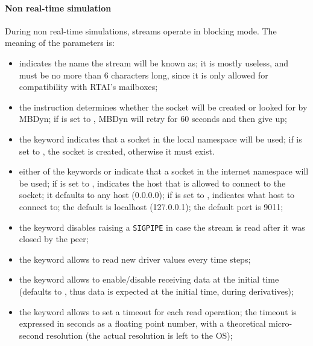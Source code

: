 \paragraph{Non real-time simulation}
During non real-time simulations, streams operate in blocking mode.
The meaning of the parameters is:
\begin{itemize}
\item {} indicates the name the stream will be known as;
it is mostly useless, and must be no more than 6 characters long,
since it is only allowed for compatibility with RTAI's mailboxes;

\item the instruction  determines whether the socket will be
created or looked for by MBDyn; if  is set to ,
MBDyn will retry for 60 seconds and then give up;

\item the keyword  indicates that a socket 
in the local namespace will be used; if  is set to ,
the socket is created, otherwise it must exist.

\item either of the keywords  or  indicate that a socket
in the internet namespace will be used;
if  is set to ,  indicates 
the host that is allowed to connect to the socket; it defaults 
to any host (0.0.0.0); if  is set to ,
 indicates what host to connect to; the default 
is localhost (127.0.0.1); the default port is 9011;

\item the keyword  disables raising a \texttt{SIGPIPE}
in case the stream is read after it was closed by the peer;

\item the keyword  allows to read new driver values
every  time steps;

\item the keyword  allows to enable/disable
receiving data at the initial time (defaults to ,
thus data is expected at the initial time, during derivatives);

\item the keyword  allows to set a timeout
for each read operation; the timeout is expressed in seconds
as a floating point number, with a theoretical micro-second resolution
(the actual resolution is left to the OS);


\end{itemize}
